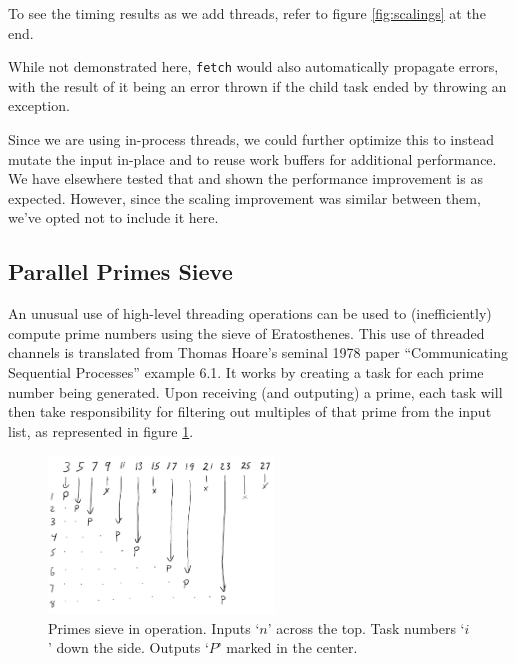 \documentclass{juliacon}
\begin{document}
To see the timing results as we add threads, refer to figure \ref{fig:scalings} at the end.

While not demonstrated here, \verb|fetch| would also automatically propagate errors, with the result of it being an error thrown if the child task ended by throwing an exception.

Since we are using in-process threads, we could further optimize this to instead mutate the input in-place and to reuse work buffers for additional performance. We have elsewhere tested that and shown the performance improvement is as expected. However, since the scaling improvement was similar between them, we've opted not to include it here.

\subsection{Parallel Primes Sieve}
\label{subsub:pprimes}

An unusual use of high-level threading operations can be used to (inefficiently) compute prime numbers using the sieve of Eratosthenes.
This use of threaded channels is translated from Thomas Hoare's seminal 1978 paper ``Communicating Sequential Processes''\cite{Hoare:1978:CSP:359576.359585} example 6.1. It works by creating a task for each prime number being generated. Upon receiving (and outputing) a prime, each task will then take responsibility for filtering out multiples of that prime from the input list, as represented in figure \ref{fig:sieve}.

\begin{figure}[ht]
\centerline{\includegraphics[width=6cm]{images/threads_sieve.png}}
\caption{Primes sieve in operation. Inputs `$n$' across the top. Task numbers `$i$' down the side. Outputs `$P$' marked in the center.}
\label{fig:sieve}
\end{figure}
\end{document}
